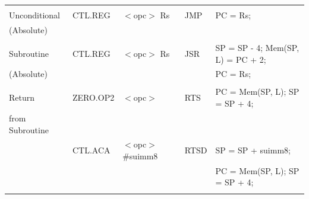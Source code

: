 \begin{table}
\begin{subtable}{\linewidth}
\begin{center}
\begin{tabular}{lllll}
                   &                   &                                       &                   &                                                                               \\
Unconditional      & CTL.REG           & $<$opc$>$ Rs                          & JMP               & PC = Rs;                                                                      \\
(Absolute)         &                   &                                       &                   &                                                                               \\
                   &                   &                                       &                   &                                                                               \\
Subroutine         & CTL.REG           & $<$opc$>$ Rs                          & JSR               & SP = SP - 4; Mem(SP, L) = PC + 2;                                             \\
(Absolute)         &                   &                                       &                   & PC = Rs;                                                                      \\
                   &                   &                                       &                   &                                                                               \\
Return             & ZERO.OP2          & $<$opc$>$                             & RTS               & PC = Mem(SP, L); SP = SP + 4;                                                 \\
from Subroutine    &                   &                                       &                   &                                                                               \\
                   & CTL.ACA           & $<$opc$>$ \#suimm8                    & RTSD              & SP = SP + suimm8;                                                             \\
                   &                   &                                       &                   & PC = Mem(SP, L); SP = SP + 4;                                                 \\
                   &                   &                                       &                   &                                                                               \\

\end{tabular}
\end{center}
\end{subtable}
\end{table}
